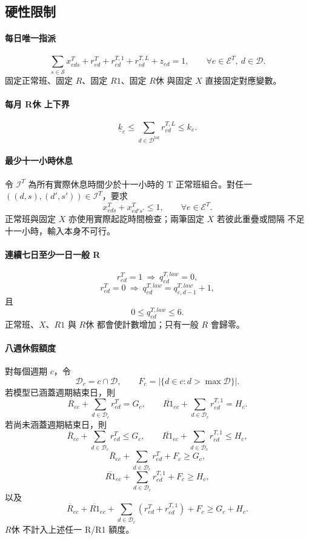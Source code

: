 \documentclass[a4paper,12pt]{article}
\begin{document}
\subsection{硬性限制}

\paragraph{每日唯一指派}
\[
  \sum_{s\in\mathcal{S}}x^{T}_{eds}
  +r^{T}_{ed}+r^{T,1}_{ed}+r^{T,L}_{ed}+z_{ed}=1,
  \qquad
  \forall e\in\mathcal{E}^{T},\ d\in\mathcal{D}.
\]
固定正常班、固定 \(R\)、固定 \(R1\)、固定 \(R休\) 與固定 \(X\) 直接固定對應變數。

\paragraph{每月 R休 上下界}
\[
  \underline{k}_e\leq
  \sum_{d\in\mathcal{D}^{\mathrm{tar}}}r^{T,L}_{ed}\leq k_e.
\]

\paragraph{最少十一小時休息}
令 \(\mathcal{I}^{T}\) 為所有實際休息時間少於十一小時的 T 正常班組合。對任一
\(((d,s),(d',s'))\in\mathcal{I}^{T}\)，要求
\[
  x^{T}_{eds}+x^{T}_{ed's'}\leq1,
  \qquad
  \forall e\in\mathcal{E}^{T}.
\]
正常班與固定 \(X\) 亦使用實際起訖時間檢查；兩筆固定 \(X\) 若彼此重疊或間隔
不足十一小時，輸入本身不可行。

\paragraph{連續七日至少一日一般 R}
\[
  r^{T}_{ed}=1
  \ \Longrightarrow\ 
  q^{T,law}_{ed}=0,
\]
\[
  r^{T}_{ed}=0
  \ \Longrightarrow\ 
  q^{T,law}_{ed}=q^{T,law}_{e,d-1}+1,
\]
且
\[
  0\leq q^{T,law}_{ed}\leq6.
\]
正常班、\(X\)、\(R1\) 與 \(R休\) 都會使計數增加；只有一般 \(R\) 會歸零。

\paragraph{八週休假額度}
對每個週期 \(c\)，令
\[
  \mathcal{D}_c=c\cap\mathcal{D},
  \qquad
  F_c=\left|\{d\in c:d>\max\mathcal{D}\}\right|.
\]
若模型已涵蓋週期結束日，則
\[
  \overline{R}_{ec}+\sum_{d\in\mathcal{D}_c}r^{T}_{ed}=G_c,
  \qquad
  \overline{R1}_{ec}+\sum_{d\in\mathcal{D}_c}r^{T,1}_{ed}=H_c.
\]
若尚未涵蓋週期結束日，則
\[
  \overline{R}_{ec}+\sum_{d\in\mathcal{D}_c}r^{T}_{ed}\leq G_c,
  \qquad
  \overline{R1}_{ec}+\sum_{d\in\mathcal{D}_c}r^{T,1}_{ed}\leq H_c,
\]
\[
  \overline{R}_{ec}+\sum_{d\in\mathcal{D}_c}r^{T}_{ed}+F_c\geq G_c,
\]
\[
  \overline{R1}_{ec}+\sum_{d\in\mathcal{D}_c}r^{T,1}_{ed}+F_c\geq H_c,
\]
以及
\[
  \overline{R}_{ec}+\overline{R1}_{ec}
  +\sum_{d\in\mathcal{D}_c}\left(r^{T}_{ed}+r^{T,1}_{ed}\right)
  +F_c
  \geq G_c+H_c.
\]
\(R休\) 不計入上述任一 R/R1 額度。
\end{document}
